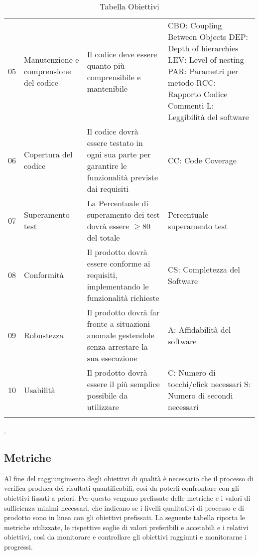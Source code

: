\begin{longtable}{ 
		>{}p{} 
		>{}p{}
        >{}p{}
        >{\centering}p{} }
        05 & Manutenzione e comprensione del codice & Il codice deve essere quanto più comprensibile e mantenibile & CBO: Coupling Between Objects \newline DEP: Depth of hierarchies \newline LEV: Level of nesting \newline PAR: Parametri per metodo \newline RCC: Rapporto Codice Commenti \newline L: Leggibilità del software \tabularnewline

        06 & Copertura del codice & Il codice dovrà essere testato in ogni sua parte per garantire le funzionalità previste dai requisiti & CC: Code Coverage \tabularnewline

        07 & Superamento test & La Percentuale di superamento dei test dovrà essere $\geq 80$ del totale & Percentuale superamento test \tabularnewline

        08 & Conformità & Il prodotto dovrà essere conforme ai requisiti, implementando le funzionalità richieste & CS: Completezza del Software \tabularnewline

        09 & Robustezza & Il prodotto dovrà far fronte a situazioni anomale gestendole senza arrestare la sua esecuzione & A: Affidabilità del software \tabularnewline

        10 & Usabilità & Il prodotto dovrà essere il più semplice possibile da utilizzare & C: Numero di tocchi/click necessari \newline S: Numero di secondi necessari\tabularnewline
        \caption{Tabella Obiettivi}
    \end{longtable}.



\subsection{Metriche}
Al fine del raggiungimento degli obiettivi di qualità è necessario che il processo di verifica produca dei risultati quantificabili, così da poterli confrontare con gli obiettivi fissati a priori. Per questo vengono prefissate delle metriche e i valori di sufficienza minimi necessari, che indicano se i livelli qualitativi di processo e di prodotto sono in linea con gli obiettivi prefissati. La seguente tabella riporta le metriche utilizzate, le rispettive soglie di valori preferibili e accetabili e i relativi obiettivi, così da monitorare e controllare gli obiettivi raggiunti e monitorarne i progressi.

